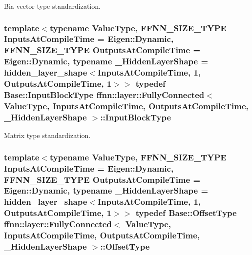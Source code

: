 Bia vector type standardization. 

\hypertarget{classffnn_1_1layer_1_1_fully_connected_a1360eaafde26c8b36ddb6fe4095b6119}{
\subsubsection[{Input\-Block\-Type}]{\setlength{\rightskip}{0pt plus 5cm}template$<$typename Value\-Type, F\-F\-N\-N\-\_\-\-S\-I\-Z\-E\-\_\-\-T\-Y\-P\-E Inputs\-At\-Compile\-Time = Eigen\-::\-Dynamic, F\-F\-N\-N\-\_\-\-S\-I\-Z\-E\-\_\-\-T\-Y\-P\-E Outputs\-At\-Compile\-Time = Eigen\-::\-Dynamic, typename \-\_\-\-Hidden\-Layer\-Shape = hidden\-\_\-layer\-\_\-shape$<$\-Inputs\-At\-Compile\-Time, 1, Outputs\-At\-Compile\-Time, 1$>$$>$ typedef {\bf Base\-::\-Input\-Block\-Type} {\bf ffnn\-::layer\-::\-Fully\-Connected}$<$ Value\-Type, Inputs\-At\-Compile\-Time, Outputs\-At\-Compile\-Time, \-\_\-\-Hidden\-Layer\-Shape $>$\-::{\bf Input\-Block\-Type}}}\label{classffnn_1_1layer_1_1_fully_connected_a1360eaafde26c8b36ddb6fe4095b6119}


Matrix type standardization. 

\hypertarget{classffnn_1_1layer_1_1_fully_connected_a0f5ae1a0bd038f404410ce2af1054833}{
\subsubsection[{Offset\-Type}]{\setlength{\rightskip}{0pt plus 5cm}template$<$typename Value\-Type, F\-F\-N\-N\-\_\-\-S\-I\-Z\-E\-\_\-\-T\-Y\-P\-E Inputs\-At\-Compile\-Time = Eigen\-::\-Dynamic, F\-F\-N\-N\-\_\-\-S\-I\-Z\-E\-\_\-\-T\-Y\-P\-E Outputs\-At\-Compile\-Time = Eigen\-::\-Dynamic, typename \-\_\-\-Hidden\-Layer\-Shape = hidden\-\_\-layer\-\_\-shape$<$\-Inputs\-At\-Compile\-Time, 1, Outputs\-At\-Compile\-Time, 1$>$$>$ typedef {\bf Base\-::\-Offset\-Type} {\bf ffnn\-::layer\-::\-Fully\-Connected}$<$ Value\-Type, Inputs\-At\-Compile\-Time, Outputs\-At\-Compile\-Time, \-\_\-\-Hidden\-Layer\-Shape $>$\-::{\bf Offset\-Type}}}\label{classffnn_1_1layer_1_1_fully_connected_a0f5ae1a0bd038f404410ce2af1054833}


